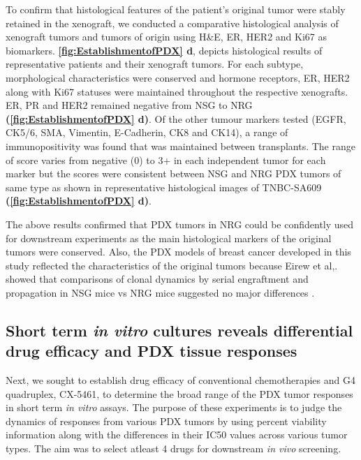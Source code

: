 To confirm that histological features of the patient's original tumor were stably retained in the xenograft, we conducted a comparative histological analysis of xenograft tumors and tumors of origin using H\&E, ER, HER2 and Ki67 as biomarkers. 
\textbf{\autoref{fig:EstablishmentofPDX} d}, depicts histological results of representative patients and their xenograft tumors. For each subtype, morphological characteristics were conserved and hormone receptors, ER, HER2 along with Ki67 statuses were maintained throughout the respective xenografts. ER, PR and HER2 remained negative from NSG to NRG \textbf{(\autoref{fig:EstablishmentofPDX} d)}. 
Of the other tumour markers tested (EGFR, CK5/6, SMA, Vimentin, E-Cadherin, CK8 and CK14), a range of immunopositivity was found that was maintained between transplants. The range of score varies from negative (0) to 3+ in each independent tumor for each marker but the scores were consistent between NSG and NRG PDX tumors of same type as shown in representative histological images of TNBC-SA609 \textbf{(\autoref{fig:EstablishmentofPDX} d)}.


 The above results confirmed that PDX tumors in \ac{NRG} could be confidently used for downstream experiments as the main histological markers of the original tumors were conserved. Also, the PDX models of breast cancer developed in this study reflected the characteristics of the original tumors because Eirew et al,. showed that comparisons of clonal dynamics by serial engraftment and propagation in NSG mice vs NRG mice suggested no major differences \cite{eirew2015dynamics}.



\subsection{Short term \textit {in vitro} cultures reveals differential drug efficacy and PDX tissue responses
}
Next, we sought to establish drug efficacy of conventional chemotherapies and G4 quadruplex, CX-5461, to determine the broad range of the PDX tumor responses in short term \textit{in vitro} assays. The purpose of these experiments is to judge the dynamics of responses from various PDX tumors by using percent viability information along with the differences in their IC50 values across various tumor types. 
The aim was to select atleast 4 drugs for downstream \textit{in vivo} screening.

